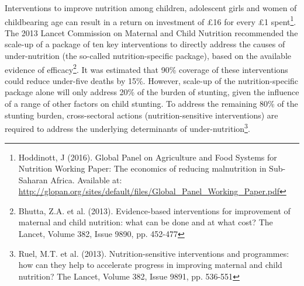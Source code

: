 Interventions to improve nutrition among children, adolescent girls and women of childbearing age can result in a return on investment of \pounds 16 for every \pounds 1 spent\footnote{Hoddinott, J (2016). Global Panel on Agriculture and Food Systems for Nutrition Working Paper: The economics of reducing malnutrition in Sub-Saharan Africa. Available at: \href{http://glopan.org/sites/default/files/Global_Panel_Working_Paper.pdf}{http://glopan.org/sites/default/files/Global\_Panel\_Working\_Paper.pdf}}. %
The 2013 Lancet Commission on Maternal and Child Nutrition recommended the scale-up of a package of ten key interventions to directly address the causes of under-nutrition (the so-called nutrition-specific package), based on the available evidence of efficacy\footnote{Bhutta, Z.A. et al. (2013). Evidence-based interventions for improvement of maternal and child nutrition: what can be done and at what cost? The Lancet, Volume 382, Issue 9890, pp. 452-477}. %
It was estimated that 90\% coverage of these interventions could reduce under-five deaths by 15\%. %
However, scale-up of the nutrition-specific package alone will only address 20\% of the burden of stunting, given the influence of a range of other factors on child stunting. %
To address the remaining 80\% of the stunting burden, cross-sectoral actions (nutrition-sensitive interventions) are required to address the underlying determinants of under-nutrition\footnote{Ruel, M.T. et al. (2013). Nutrition-sensitive interventions and programmes: how can they help to accelerate progress in improving maternal and child nutrition? The Lancet, Volume 382, Issue 9891, pp. 536-551}. %

\newpage
